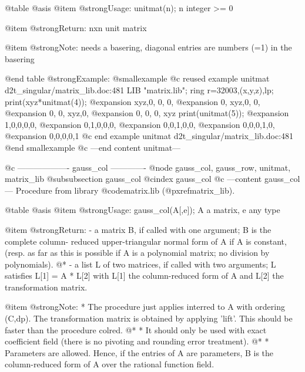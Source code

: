 @table @asis
@item @strong{Usage:}
unitmat(n); n integer >= 0

@item @strong{Return:}
nxn unit matrix

@item @strong{Note:}
needs a basering, diagonal entries are numbers (=1) in the basering

@end table
@strong{Example:}
@smallexample
@c reused example unitmat d2t_singular/matrix_lib.doc:481 
LIB "matrix.lib";
ring r=32003,(x,y,z),lp;
print(xyz*unitmat(4));
@expansion{} xyz,0,  0,  0, 
@expansion{} 0,  xyz,0,  0, 
@expansion{} 0,  0,  xyz,0, 
@expansion{} 0,  0,  0,  xyz
print(unitmat(5));
@expansion{} 1,0,0,0,0,
@expansion{} 0,1,0,0,0,
@expansion{} 0,0,1,0,0,
@expansion{} 0,0,0,1,0,
@expansion{} 0,0,0,0,1 
@c end example unitmat d2t_singular/matrix_lib.doc:481
@end smallexample
@c ---end content unitmat---

@c ------------------- gauss_col -------------
@node gauss_col, gauss_row, unitmat, matrix_lib
@subsubsection gauss_col
@cindex gauss_col
@c ---content gauss_col---
Procedure from library @code{matrix.lib} (@pxref{matrix_lib}).

@table @asis
@item @strong{Usage:}
gauss_col(A[,e]); A a matrix, e any type

@item @strong{Return:}
- a matrix B, if called with one argument; B is the complete column-
reduced upper-triangular normal form of A if A is constant,
(resp. as far as this is possible if A is a polynomial matrix;
no division by polynomials).
@* - a list L of two matrices, if called with two arguments;
L satisfies L[1] = A * L[2] with L[1] the column-reduced form of A
and L[2] the transformation matrix.

@item @strong{Note:}
* The procedure just applies interred to A with ordering (C,dp).
The transformation matrix is obtained by applying 'lift'.
This should be faster than the procedure colred.
@* * It should only be used with exact coefficient field (there is no
pivoting and rounding error treatment).
@* * Parameters are allowed. Hence, if the entries of A are parameters,
B is the column-reduced form of A over the rational function field.

